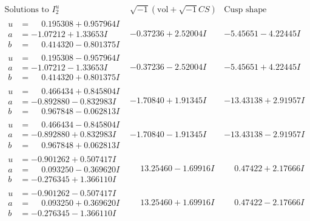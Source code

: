 \documentclass[1p]{elsarticle_modified}
\theoremstyle{definition}
\newcommand{\I}{\sqrt{-1}}
\begin{document}
$$\begin{array}{c|c|c}  
\text{Solutions to }I^u_{2}& \I (\text{vol} + \sqrt{-1}CS) & \text{Cusp shape}\\
 \hline 
\begin{aligned}
u &= \phantom{-}0.195308 + 0.957964 I \\
a &= -1.07212 + 1.33653 I \\
b &= \phantom{-}0.414320 - 0.801375 I\end{aligned}
 & -0.37236 + 2.52004 I & -5.45651 - 4.22445 I \\ \hline\begin{aligned}
u &= \phantom{-}0.195308 - 0.957964 I \\
a &= -1.07212 - 1.33653 I \\
b &= \phantom{-}0.414320 + 0.801375 I\end{aligned}
 & -0.37236 - 2.52004 I & -5.45651 + 4.22445 I \\ \hline\begin{aligned}
u &= \phantom{-}0.466434 + 0.845804 I \\
a &= -0.892880 - 0.832983 I \\
b &= \phantom{-}0.967848 - 0.062813 I\end{aligned}
 & -1.70840 + 1.91345 I & -13.43138 + 2.91957 I \\ \hline\begin{aligned}
u &= \phantom{-}0.466434 - 0.845804 I \\
a &= -0.892880 + 0.832983 I \\
b &= \phantom{-}0.967848 + 0.062813 I\end{aligned}
 & -1.70840 - 1.91345 I & -13.43138 - 2.91957 I \\ \hline\begin{aligned}
u &= -0.901262 + 0.507417 I \\
a &= \phantom{-}0.093250 - 0.369620 I \\
b &= -0.276345 + 1.366110 I\end{aligned}
 & \phantom{-}13.25460 - 1.69916 I & \phantom{-}0.47422 + 2.17666 I \\ \hline\begin{aligned}
u &= -0.901262 - 0.507417 I \\
a &= \phantom{-}0.093250 + 0.369620 I \\
b &= -0.276345 - 1.366110 I\end{aligned}
 & \phantom{-}13.25460 + 1.69916 I & \phantom{-}0.47422 - 2.17666 I \\ \hline\begin{aligned}

\end{aligned}
\end{array}$$
\end{document}
